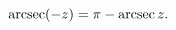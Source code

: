 \[\mathop{\mathrm{arcsec}\/}\nolimits\!\left(-z\right)=\pi-\mathop{\mathrm{%
arcsec}\/}\nolimits z.\]